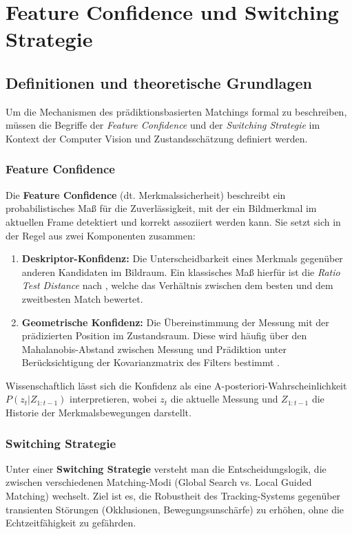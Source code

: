 \chapter{Feature Confidence und Switching Strategie}
\label{ch:FeatureConfidenceundSwitchingStrategie}

\section{Definitionen und theoretische Grundlagen}
\label{sec:Definitionen}

Um die Mechanismen des prädiktionsbasierten Matchings formal zu beschreiben, müssen die Begriffe der \textit{Feature Confidence} und der \textit{Switching Strategie} im Kontext der Computer Vision und Zustandsschätzung definiert werden.

\subsection{Feature Confidence}
Die \textbf{Feature Confidence} (dt. Merkmalssicherheit) beschreibt ein probabilistisches Maß für die Zuverlässigkeit, mit der ein Bildmerkmal im aktuellen Frame detektiert und korrekt assoziiert werden kann. Sie setzt sich in der Regel aus zwei Komponenten zusammen:

\begin{enumerate}
    \item \textbf{Deskriptor-Konfidenz:} Die Unterscheidbarkeit eines Merkmals gegenüber anderen Kandidaten im Bildraum. Ein klassisches Maß hierfür ist die \textit{Ratio Test Distance} nach \cite{lowe2004sift}, welche das Verhältnis zwischen dem besten und dem zweitbesten Match bewertet.
    \item \textbf{Geometrische Konfidenz:} Die Übereinstimmung der Messung mit der prädizierten Position im Zustandsraum. Diese wird häufig über den Mahalanobis-Abstand zwischen Messung und Prädiktion unter Berücksichtigung der Kovarianzmatrix des Filters bestimmt \cite{bar2001estimation}.
\end{enumerate}

Wissenschaftlich lässt sich die Konfidenz als eine A-posteriori-Wahrscheinlichkeit $P(z_t | Z_{1:t-1})$ interpretieren, wobei $z_t$ die aktuelle Messung und $Z_{1:t-1}$ die Historie der Merkmalsbewegungen darstellt.

\subsection{Switching Strategie}
Unter einer \textbf{Switching Strategie} versteht man die Entscheidungslogik, die zwischen verschiedenen Matching-Modi (Global Search vs. Local Guided Matching) wechselt. Ziel ist es, die Robustheit des Tracking-Systems gegenüber transienten Störungen (Okklusionen, Bewegungsunschärfe) zu erhöhen, ohne die Echtzeitfähigkeit zu gefährden.


